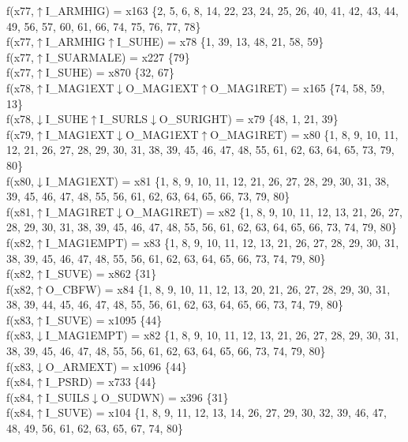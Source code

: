f(x77,$\uparrow$I\_ARMHIG) = x163 \{2, 5, 6, 8, 14, 22, 23, 24, 25, 26, 40, 41, 42, 43, 44, 49, 56, 57, 60, 61, 66, 74, 75, 76, 77, 78\} \\  
f(x77,$\uparrow$I\_ARMHIG$\uparrow$I\_SUHE) = x78 \{1, 39, 13, 48, 21, 58, 59\} \\  
f(x77,$\uparrow$I\_SUARMALE) = x227 \{79\} \\  
f(x77,$\uparrow$I\_SUHE) = x870 \{32, 67\} \\  
f(x78,$\uparrow$I\_MAG1EXT$\downarrow$O\_MAG1EXT$\uparrow$O\_MAG1RET) = x165 \{74, 58, 59, 13\} \\  
f(x78,$\downarrow$I\_SUHE$\uparrow$I\_SURLS$\downarrow$O\_SURIGHT) = x79 \{48, 1, 21, 39\} \\  
f(x79,$\uparrow$I\_MAG1EXT$\downarrow$O\_MAG1EXT$\uparrow$O\_MAG1RET) = x80 \{1, 8, 9, 10, 11, 12, 21, 26, 27, 28, 29, 30, 31, 38, 39, 45, 46, 47, 48, 55, 61, 62, 63, 64, 65, 73, 79, 80\} \\  
f(x80,$\downarrow$I\_MAG1EXT) = x81 \{1, 8, 9, 10, 11, 12, 21, 26, 27, 28, 29, 30, 31, 38, 39, 45, 46, 47, 48, 55, 56, 61, 62, 63, 64, 65, 66, 73, 79, 80\} \\  
f(x81,$\uparrow$I\_MAG1RET$\downarrow$O\_MAG1RET) = x82 \{1, 8, 9, 10, 11, 12, 13, 21, 26, 27, 28, 29, 30, 31, 38, 39, 45, 46, 47, 48, 55, 56, 61, 62, 63, 64, 65, 66, 73, 74, 79, 80\} \\  
f(x82,$\uparrow$I\_MAG1EMPT) = x83 \{1, 8, 9, 10, 11, 12, 13, 21, 26, 27, 28, 29, 30, 31, 38, 39, 45, 46, 47, 48, 55, 56, 61, 62, 63, 64, 65, 66, 73, 74, 79, 80\} \\  
f(x82,$\uparrow$I\_SUVE) = x862 \{31\} \\  
f(x82,$\uparrow$O\_CBFW) = x84 \{1, 8, 9, 10, 11, 12, 13, 20, 21, 26, 27, 28, 29, 30, 31, 38, 39, 44, 45, 46, 47, 48, 55, 56, 61, 62, 63, 64, 65, 66, 73, 74, 79, 80\} \\  
f(x83,$\uparrow$I\_SUVE) = x1095 \{44\} \\  
f(x83,$\downarrow$I\_MAG1EMPT) = x82 \{1, 8, 9, 10, 11, 12, 13, 21, 26, 27, 28, 29, 30, 31, 38, 39, 45, 46, 47, 48, 55, 56, 61, 62, 63, 64, 65, 66, 73, 74, 79, 80\} \\  
f(x83,$\downarrow$O\_ARMEXT) = x1096 \{44\} \\  
f(x84,$\uparrow$I\_PSRD) = x733 \{44\} \\  
f(x84,$\uparrow$I\_SUILS$\downarrow$O\_SUDWN) = x396 \{31\} \\  
f(x84,$\uparrow$I\_SUVE) = x104 \{1, 8, 9, 11, 12, 13, 14, 26, 27, 29, 30, 32, 39, 46, 47, 48, 49, 56, 61, 62, 63, 65, 67, 74, 80\} \\  
